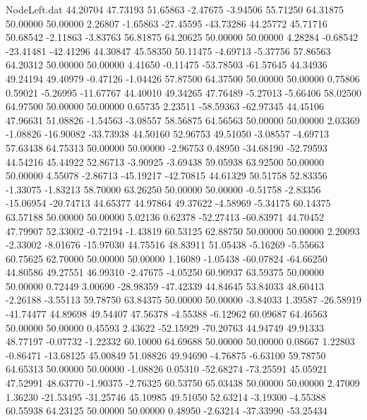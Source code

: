\begin{filecontents}{NodeLeft.dat}
  44.20704   47.73193   51.65863    -2.47675   -3.94506   55.71250   64.31875   50.00000   50.00000    2.26807   -1.65863  -27.45595  -43.73286
  44.25772   45.71716   50.68542    -2.11863   -3.83763   56.81875   64.20625   50.00000   50.00000    4.28284   -0.68542  -23.41481  -42.41296
  44.30847   45.58350   50.11475    -4.69713   -5.37756   57.86563   64.20312   50.00000   50.00000    4.41650   -0.11475  -53.78503  -61.57645
  44.34936   49.24194   49.40979    -0.47126   -1.04426   57.87500   64.37500   50.00000   50.00000    0.75806    0.59021   -5.26995  -11.67767
  44.40010   49.34265   47.76489    -5.27013   -5.66406   58.02500   64.97500   50.00000   50.00000    0.65735    2.23511  -58.59363  -62.97345
  44.45106   47.96631   51.08826    -1.54563   -3.08557   58.56875   64.56563   50.00000   50.00000    2.03369   -1.08826  -16.90082  -33.73938
  44.50160   52.96753   49.51050    -3.08557   -4.69713   57.63438   64.75313   50.00000   50.00000   -2.96753    0.48950  -34.68190  -52.79593
  44.54216   45.44922   52.86713    -3.90925   -3.69438   59.05938   63.92500   50.00000   50.00000    4.55078   -2.86713  -45.19217  -42.70815
  44.61329   50.51758   52.83356    -1.33075   -1.83213   58.70000   63.26250   50.00000   50.00000   -0.51758   -2.83356  -15.06954  -20.74713
  44.65377   44.97864   49.37622    -4.58969   -5.34175   60.14375   63.57188   50.00000   50.00000    5.02136    0.62378  -52.27413  -60.83971
  44.70452   47.79907   52.33002    -0.72194   -1.43819   60.53125   62.88750   50.00000   50.00000    2.20093   -2.33002   -8.01676  -15.97030
  44.75516   48.83911   51.05438    -5.16269   -5.55663   60.75625   62.70000   50.00000   50.00000    1.16089   -1.05438  -60.07824  -64.66250
  44.80586   49.27551   46.99310    -2.47675   -4.05250   60.90937   63.59375   50.00000   50.00000    0.72449    3.00690  -28.98359  -47.42339
  44.84645   53.84033   48.60413    -2.26188   -3.55113   59.78750   63.84375   50.00000   50.00000   -3.84033    1.39587  -26.58919  -41.74477
  44.89698   49.54407   47.56378    -4.55388   -6.12962   60.09687   64.46563   50.00000   50.00000    0.45593    2.43622  -52.15929  -70.20763
  44.94749   49.91333   48.77197    -0.07732   -1.22332   60.10000   64.69688   50.00000   50.00000    0.08667    1.22803   -0.86471  -13.68125
  45.00849   51.08826   49.94690    -4.76875   -6.63100   59.78750   64.65313   50.00000   50.00000   -1.08826    0.05310  -52.68274  -73.25591
  45.05921   47.52991   48.63770    -1.90375   -2.76325   60.53750   65.03438   50.00000   50.00000    2.47009    1.36230  -21.53495  -31.25746
  45.10985   49.51050   52.63214    -3.19300   -4.55388   60.55938   64.23125   50.00000   50.00000    0.48950   -2.63214  -37.33990  -53.25434

\end{filecontents}
